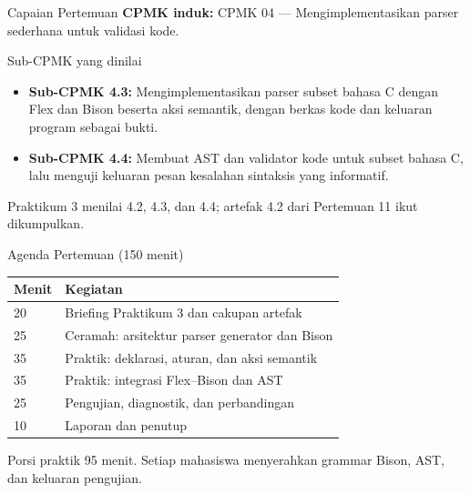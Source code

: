 \documentclass[aspectratio=169,10pt,t]{beamer}
\begin{document}

\begin{frame}{Capaian Pertemuan}
  \textbf{CPMK induk:} CPMK 04 --- Mengimplementasikan parser sederhana
  untuk validasi kode.

  \vspace{3pt}
  \begin{block}{Sub-CPMK yang dinilai}
    \footnotesize
    \begin{itemize}
      \setlength{\itemsep}{2pt}
      \item \textbf{Sub-CPMK 4.3:} Mengimplementasikan parser subset
            bahasa C dengan Flex dan Bison beserta aksi semantik,
            dengan berkas kode dan keluaran program sebagai bukti.
      \item \textbf{Sub-CPMK 4.4:} Membuat AST dan validator kode
            untuk subset bahasa C, lalu menguji keluaran pesan
            kesalahan sintaksis yang informatif.
    \end{itemize}
  \end{block}

  \vspace{2pt}
  {\footnotesize Praktikum 3 menilai 4.2, 4.3, dan 4.4; artefak 4.2
  dari Pertemuan 11 ikut dikumpulkan.}
\end{frame}

\begin{frame}{Agenda Pertemuan (150 menit)}
  \small
  \begin{tabular}{@{}p{1.4cm}p{12.3cm}@{}}
    \toprule
    \textbf{Menit} & \textbf{Kegiatan} \\
    \midrule
    20 & Briefing Praktikum 3 dan cakupan artefak \\
    25 & Ceramah: arsitektur parser generator dan Bison \\
    35 & Praktik: deklarasi, aturan, dan aksi semantik \\
    35 & Praktik: integrasi Flex--Bison dan AST \\
    25 & Pengujian, diagnostik, dan perbandingan \\
    10 & Laporan dan penutup \\
    \bottomrule
  \end{tabular}

  \vspace{6pt}
  {\scriptsize\color{ubbblue!75}Porsi praktik 95 menit. Setiap
  mahasiswa menyerahkan grammar Bison, AST, dan keluaran pengujian.}
\end{frame}
\end{document}
